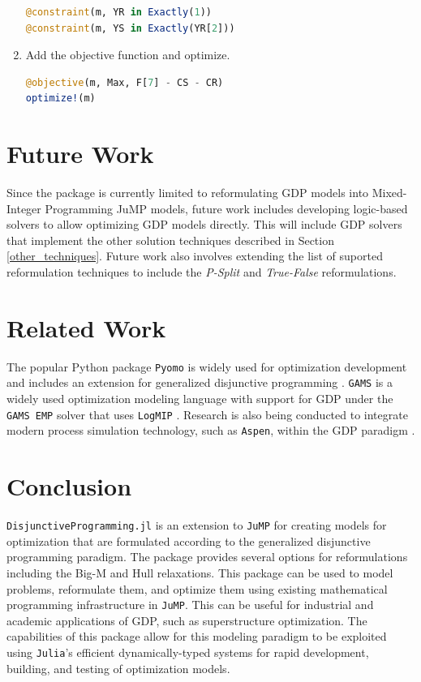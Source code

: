 \documentclass{juliacon}
\begin{document}
\begin{enumerate}
\begin{lstlisting}[language = Julia]
@constraint(m, YR in Exactly(1))
@constraint(m, YS in Exactly(YR[2]))
\end{lstlisting}
    \item Add the objective function and optimize.
\begin{lstlisting}[language = Julia]
@objective(m, Max, F[7] - CS - CR)
optimize!(m)
\end{lstlisting}
\end{enumerate}

\section{Future Work}
Since the package is currently limited to reformulating GDP models into Mixed-Integer Programming JuMP models, future work includes developing logic-based solvers to allow optimizing GDP models directly. This will include GDP solvers that implement the other solution techniques described in Section \ref{other_techniques}. Future work also involves extending the list of suported reformulation techniques to include the \textit{P-Split} \cite{kronqvist2022p} and \textit{True-False} \cite{agarwal2015novel} reformulations.

\section{Related Work}
The popular Python package \verb|Pyomo| \cite{bynum2021pyomo, hart2011pyomo} is widely used for optimization development and includes an extension for generalized disjunctive programming \cite{chen2022pyomo}. \verb|GAMS| \cite{Bussieck2004} is a widely used optimization modeling language with support for GDP under the \verb|GAMS EMP| solver that uses \verb|LogMIP| \cite{vecchietti1999logmip}. Research is also being conducted to integrate modern process simulation technology, such as \verb|Aspen|, within the GDP paradigm \cite{NAVARROAMOROS201413}.

\section{Conclusion}
\verb|DisjunctiveProgramming.jl| is an extension to \verb|JuMP| for creating models for optimization that are formulated according to the generalized disjunctive programming paradigm. The package provides several options for reformulations including the Big-M and Hull relaxations. This package can be used to model problems, reformulate them, and optimize them using existing mathematical programming infrastructure in \verb|JuMP|. This can be useful for industrial and academic applications of GDP, such as superstructure optimization. The capabilities of this package allow for this modeling paradigm to be exploited using \verb|Julia|'s efficient dynamically-typed systems for rapid development, building, and testing of optimization models.


\end{document}
